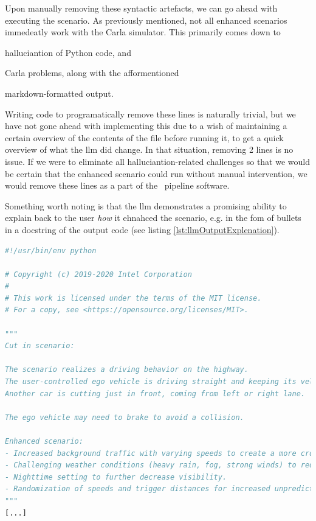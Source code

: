 Upon manually removing these syntactic artefacts, we can go ahead with executing
the scenario. As previously mentioned, not all enhanced scenarios immedeatly work with the Carla
simulator. This primarily comes down to \begin{inparaenum}
    \item halluciantion of Python code, and
    \item Carla problems, along with the afformentioned
    \item markdown-formatted output.
\end{inparaenum}

Writing code to programatically remove these lines is naturally trivial, but we have
not gone ahead with implementing this due to a wish of maintaining a certain overview of the
contents of the file before running it, to get a quick overview of what the \acrshort{llm} did
change. In that situation, removing \num{2} lines is no issue. If we were to eliminate all
halluciantion-related challenges so that we would be certain that the enhanced scenario could run
without manual intervention, we would remove these lines as a part of the \hefe~pipeline software.

Something worth noting is that the \acrshort{llm} demonstrates a promising
ability to explain back to the user \emph{how} it ehnahced the scenario, e.g. in
the fom of bullets in a docstring of the output code (see listing \ref{lst:llmOutputExplenation}).

\begin{lstlisting}[caption={Head of an \acrshort{llm}-enhanced scenario, highlighting how the \acrshort{llm} can add an explenation of how it enhanced the scenario.}, label={lst:llmOutputExplenation}, language={Python}]
#!/usr/bin/env python

# Copyright (c) 2019-2020 Intel Corporation
#
# This work is licensed under the terms of the MIT license.
# For a copy, see <https://opensource.org/licenses/MIT>.

"""
Cut in scenario:

The scenario realizes a driving behavior on the highway.
The user-controlled ego vehicle is driving straight and keeping its velocity at a constant level.
Another car is cutting just in front, coming from left or right lane.

The ego vehicle may need to brake to avoid a collision.

Enhanced scenario:
- Increased background traffic with varying speeds to create a more crowded environment.
- Challenging weather conditions (heavy rain, fog, strong winds) to reduce visibility and grip.
- Nighttime setting to further decrease visibility.
- Randomization of speeds and trigger distances for increased unpredictability.
"""
[...]
\end{lstlisting}

